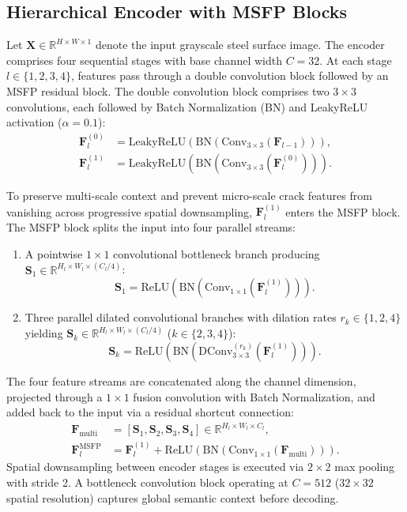 \documentclass{ieeeaccess}
\begin{document}
\subsection{Hierarchical Encoder with MSFP Blocks}
\label{sec:msfp_module}
Let $\mathbf{X} \in \mathbb{R}^{H \times W \times 1}$ denote the input grayscale steel surface image. The encoder comprises four sequential stages with base channel width $C = 32$. At each stage $l \in \{1, 2, 3, 4\}$, features pass through a double convolution block followed by an MSFP residual block. The double convolution block comprises two $3 \times 3$ convolutions, each followed by Batch Normalization (BN) and LeakyReLU activation ($\alpha = 0.1$):
\begin{align}
  \mathbf{F}_l^{(0)} &= \text{LeakyReLU}\left(\text{BN}\left(\text{Conv}_{3\times 3}(\mathbf{F}_{l-1})\right)\right), \\
  \mathbf{F}_l^{(1)} &= \text{LeakyReLU}\left(\text{BN}\left(\text{Conv}_{3\times 3}(\mathbf{F}_l^{(0)})\right)\right).
\end{align}

To preserve multi-scale context and prevent micro-scale crack features from vanishing across progressive spatial downsampling, $\mathbf{F}_l^{(1)}$ enters the MSFP block. The MSFP block splits the input into four parallel streams:
\begin{enumerate}
    \item A pointwise $1 \times 1$ convolutional bottleneck branch producing $\mathbf{S}_1 \in \mathbb{R}^{H_l \times W_l \times (C_l/4)}$:
    \begin{equation}
      \mathbf{S}_1 = \text{ReLU}\left(\text{BN}\left(\text{Conv}_{1 \times 1}(\mathbf{F}_l^{(1)})\right)\right).
    \end{equation}
    \item Three parallel dilated convolutional branches with dilation rates $r_k \in \{1, 2, 4\}$ yielding $\mathbf{S}_k \in \mathbb{R}^{H_l \times W_l \times (C_l/4)}$ ($k \in \{2, 3, 4\}$):
    \begin{equation}
      \mathbf{S}_k = \text{ReLU}\left(\text{BN}\left(\text{DConv}_{3 \times 3}^{(r_k)}(\mathbf{F}_l^{(1)})\right)\right).
    \end{equation}
\end{enumerate}
The four feature streams are concatenated along the channel dimension, projected through a $1 \times 1$ fusion convolution with Batch Normalization, and added back to the input via a residual shortcut connection:
\begin{align}
  \mathbf{F}_{\text{multi}} &= \left[\mathbf{S}_1, \mathbf{S}_2, \mathbf{S}_3, \mathbf{S}_4\right] \in \mathbb{R}^{H_l \times W_l \times C_l}, \\
  \mathbf{F}_l^{\text{MSFP}} &= \mathbf{F}_l^{(1)} + \text{ReLU}\left(\text{BN}\left(\text{Conv}_{1 \times 1}(\mathbf{F}_{\text{multi}})\right)\right).
\end{align}
Spatial downsampling between encoder stages is executed via $2 \times 2$ max pooling with stride 2. A bottleneck convolution block operating at $C = 512$ ($32 \times 32$ spatial resolution) captures global semantic context before decoding.
\end{document}
